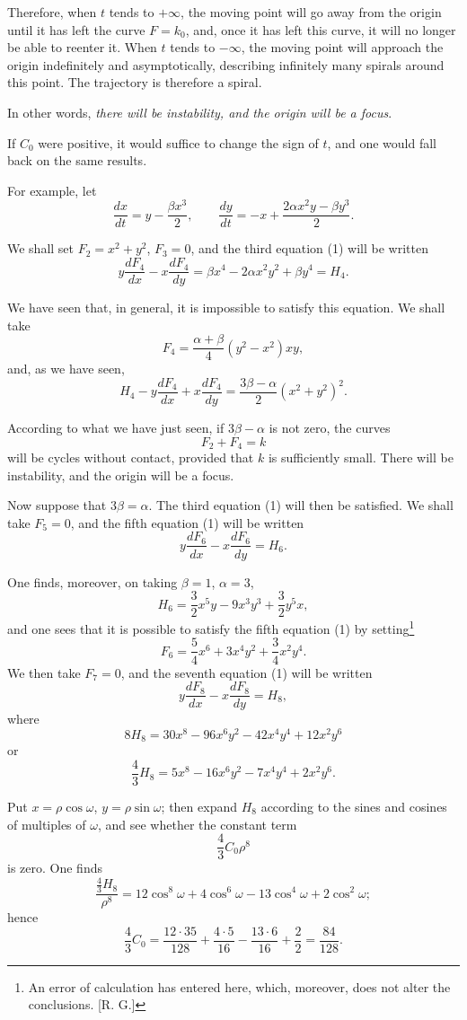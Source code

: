 \documentclass[11pt]{article}
\begin{document}
Therefore, when $t$ tends to $+\infty$, the moving point will go away from the origin until it has left the curve $F=k_0$, and, once it has left this curve, it will no longer be able to reenter it. When $t$ tends to $-\infty$, the moving point will approach the origin indefinitely and asymptotically, describing infinitely many spirals around this point. The trajectory is therefore a spiral.

In other words, \emph{there will be instability, and the origin will be a focus}.

If $C_0$ were positive, it would suffice to change the sign of $t$, and one would fall back on the same results.

For example, let
\[
\frac{dx}{dt}=y-\frac{\beta x^3}{2},
\qquad
\frac{dy}{dt}=-x+\frac{2\alpha x^2y-\beta y^3}{2}.
\]

We shall set $F_2=x^2+y^2$, $F_3=0$, and the third equation (1) will be written
\[
y\frac{dF_4}{dx}-x\frac{dF_4}{dy}=\beta x^4-2\alpha x^2y^2+\beta y^4=H_4.
\]

We have seen that, in general, it is impossible to satisfy this equation. We shall take
\[
F_4=\frac{\alpha+\beta}{4}(y^2-x^2)xy,
\]
and, as we have seen,
\[
H_4-y\frac{dF_4}{dx}+x\frac{dF_4}{dy}=\frac{3\beta-\alpha}{2}(x^2+y^2)^2.
\]

According to what we have just seen, if $3\beta-\alpha$ is not zero, the curves
\[
F_2+F_4=k
\]
will be cycles without contact, provided that $k$ is sufficiently small. There will be instability, and the origin will be a focus.

Now suppose that $3\beta=\alpha$. The third equation (1) will then be satisfied. We shall take $F_5=0$, and the fifth equation (1) will be written
\[
y\frac{dF_6}{dx}-x\frac{dF_6}{dy}=H_6.
\]

One finds, moreover, on taking $\beta=1$, $\alpha=3$,
\[
H_6=\frac{3}{2}x^5y-9x^3y^3+\frac{3}{2}y^5x,
\]
and one sees that it is possible to satisfy the fifth equation (1) by setting\footnote{An error of calculation has entered here, which, moreover, does not alter the conclusions. [R. G.]}
\[
F_6=\frac{5}{4}x^6+3x^4y^2+\frac{3}{4}x^2y^4.
\]
We then take $F_7=0$, and the seventh equation (1) will be written
\[
y\frac{dF_8}{dx}-x\frac{dF_8}{dy}=H_8,
\]
where
\[
8H_8=30x^8-96x^6y^2-42x^4y^4+12x^2y^6
\]
or
\[
\frac{4}{3}H_8=5x^8-16x^6y^2-7x^4y^4+2x^2y^6.
\]

Put $x=\rho\cos\omega$, $y=\rho\sin\omega$; then expand $H_8$ according to the sines and cosines of multiples of $\omega$, and see whether the constant term
\[
\frac{4}{3}C_0\rho^8
\]
is zero. One finds
\[
\frac{\frac{4}{3}H_8}{\rho^8}=12\cos^8\omega+4\cos^6\omega-13\cos^4\omega+2\cos^2\omega;
\]
hence
\[
\frac{4}{3}C_0=\frac{12\cdot35}{128}+\frac{4\cdot5}{16}-\frac{13\cdot6}{16}+\frac{2}{2}=\frac{84}{128}.
\]
\end{document}
